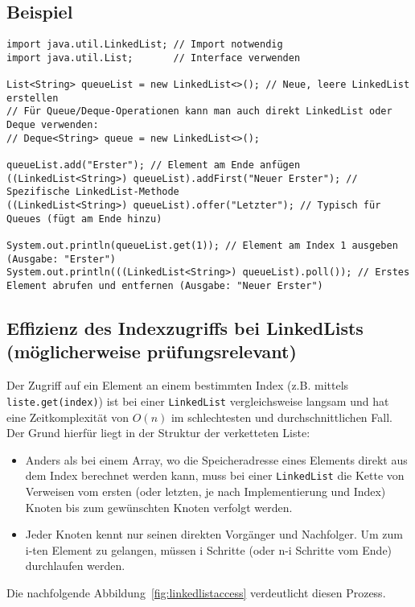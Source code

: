 \subsection{Beispiel}
\begin{lstlisting}[caption={Beispiel für die Verwendung einer LinkedList in Java}, label=lst:linkedListExample]
import java.util.LinkedList; // Import notwendig
import java.util.List;       // Interface verwenden

List<String> queueList = new LinkedList<>(); // Neue, leere LinkedList erstellen
// Für Queue/Deque-Operationen kann man auch direkt LinkedList oder Deque verwenden:
// Deque<String> queue = new LinkedList<>();

queueList.add("Erster"); // Element am Ende anfügen
((LinkedList<String>) queueList).addFirst("Neuer Erster"); // Spezifische LinkedList-Methode
((LinkedList<String>) queueList).offer("Letzter"); // Typisch für Queues (fügt am Ende hinzu)

System.out.println(queueList.get(1)); // Element am Index 1 ausgeben (Ausgabe: "Erster")
System.out.println(((LinkedList<String>) queueList).poll()); // Erstes Element abrufen und entfernen (Ausgabe: "Neuer Erster")
\end{lstlisting}

\subsection{Effizienz des Indexzugriffs bei LinkedLists (möglicherweise prüfungsrelevant)}
\label{subsec:LinkedListIndexAccess}
Der Zugriff auf ein Element an einem bestimmten Index (z.B. mittels \texttt{liste.get(index)}) ist bei einer \texttt{LinkedList} vergleichsweise langsam und hat eine Zeitkomplexität von $O(n)$ im schlechtesten und durchschnittlichen Fall. Der Grund hierfür liegt in der Struktur der verketteten Liste:
\begin{itemize}
    \item Anders als bei einem Array, wo die Speicheradresse eines Elements direkt aus dem Index berechnet werden kann, muss bei einer \texttt{LinkedList} die Kette von Verweisen vom ersten (oder letzten, je nach Implementierung und Index) Knoten bis zum gewünschten Knoten verfolgt werden.
    \item Jeder Knoten kennt nur seinen direkten Vorgänger und Nachfolger. Um zum i-ten Element zu gelangen, müssen i Schritte (oder n-i Schritte vom Ende) durchlaufen werden.
\end{itemize}
Die nachfolgende Abbildung~\ref{fig:linkedlistaccess} verdeutlicht diesen Prozess.

